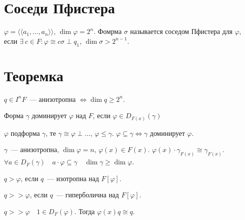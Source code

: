\documentclass[12pt]{article}
\begin{document}
    \section{Соседи Пфистера}
    
    \begin{definition}
    	$\varphi = \langle \langle a_1, \dots, a_n \rangle \rangle$, $\dim \varphi = 2^n$. Фомрма $\sigma$ называется соседом Пфистера для $\varphi$, если $\exists \ c \in F: \varphi \cong c \sigma \perp q_1$, $\dim \sigma > 2^{n - 1}$.
    \end{definition}
    
    \section{Теоремка}
    
    \begin{theorem}
    	$q \in I^nF$~--- анизотропна $\Leftrightarrow \dim q \geqslant 2^n$.
    \end{theorem}
    
    \begin{definition}
    	Форма $\gamma$ доминирует $\varphi$ над $F$, если $\varphi \in D_{F(x)}(\gamma)$
    \end{definition}
    
    \begin{corollary}
    	$\varphi$ подформа $\gamma$, те $\gamma \cong \varphi \perp \dots$, $\varphi \leqslant \gamma$. $\varphi \subseteq \gamma \Leftrightarrow \gamma$ доминирует $\varphi$.
    \end{corollary}
    
    \begin{corollary}
    	$\gamma$~--- анизотропна, $\dim \varphi = n$, $\varphi(x) \in F(x)$. $\varphi(x) \cdot \gamma_{F(x)} \cong \gamma_{F(x)}$. $\forall a \in D_F(\gamma) \quad a \cdot \varphi \subseteq \gamma \quad \dim \gamma \geqslant \dim \varphi$.
    \end{corollary}
    
    \begin{definition}
    	$q > \varphi$, если $q$~--- изотропна над $F[\varphi]$.
		
		$q >> \varphi$, если $q$~--- гиперболична над $F[\varphi]$.
    \end{definition}
    
    \begin{theorem}
    	$q >> \varphi \quad 1 \in D_F(\varphi)$. Тогда $\varphi(x) q \cong q$.
    \end{theorem}
\end{document}

